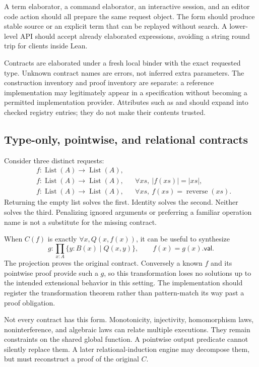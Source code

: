 A term elaborator, a command elaborator, an interactive session, and an editor
code action should all prepare the same request object. The  form should
produce stable source or an explicit term that can be replayed without search.
A lower-level API should accept already elaborated expressions, avoiding a
string round trip for clients inside Lean.

Contracts are elaborated under a fresh local binder with the exact requested
type. Unknown contract names are errors, not inferred extra parameters. The
construction inventory and proof inventory are separate: a reference
implementation may legitimately appear in a specification without becoming a
permitted implementation provider. Attributes such as 
and  should expand into checked registry entries; they do
not make their contents trusted.

\subsection{Type-only, pointwise, and relational contracts}

Consider three distinct requests:
\begin{align*}
 &f:\operatorname{List}(A)\to\operatorname{List}(A),\\
 &f:\operatorname{List}(A)\to\operatorname{List}(A),
 &&\forall xs,\ |f(xs)|=|xs|,\\
 &f:\operatorname{List}(A)\to\operatorname{List}(A),
 &&\forall xs,\ f(xs)=\operatorname{reverse}(xs).
\end{align*}
Returning the empty list solves the first. Identity solves the second. Neither
solves the third. Penalizing ignored arguments or preferring a familiar
operation name is not a substitute for the missing contract.

When $C(f)$ is exactly $\forall x,Q(x,f(x))$, it can be useful to synthesize
\[
 g:\prod_{x:A}\{y:B(x)\mid Q(x,y)\},
 \qquad f(x)=g(x).\mathsf{val}.
\]
The projection proves the original contract. Conversely a known $f$ and its
pointwise proof provide such a $g$, so this transformation loses no solutions
up to the intended extensional behavior in this setting. The implementation
should register the transformation theorem rather than pattern-match its way
past a proof obligation.

Not every contract has this form. Monotonicity, injectivity, homomorphism laws,
noninterference, and algebraic laws can relate multiple executions. They remain
constraints on the shared global function. A pointwise output predicate cannot
silently replace them. A later relational-induction engine may decompose them,
but must reconstruct a proof of the original $C$.

